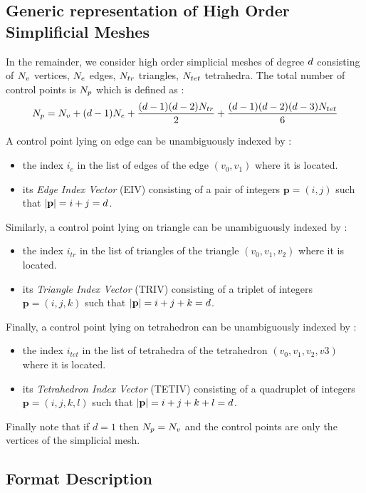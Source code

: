 \documentclass[a4paper,11pt]{article}
\begin{document}
\subsection{Generic representation of High Order Simplificial Meshes}

In the remainder, we consider high order simplicial meshes of degree ${d}$ consisting of ${N_v}$ vertices, ${ N_e}$ edges, ${N_{tr}}$ triangles, ${N_{tet}}$ tetrahedra. The total number of control points is ${N_{p}}$ which is defined as :
\begin{equation}
{N_{p}}={N_v} + ({d}-1){ N_e}+\frac{({d}-1)({d}-2){N_{tr}}}{2} +\frac{({d}-1)({d}-2)({d}-3){N_{tet}}}{6}
\label{eq;np}
\end{equation}


A control point lying on edge can be unambiguously indexed by :
\begin{itemize}
	\item the index $i_e$ in the list of edges of the edge $(v_0,v_1)$ where it is located.
	\item its {\em Edge Index Vector} (EIV) consisting of a pair of integers ${\mathbf p}=(i,j)$ such that $|{\mathbf p}|=i+j={d}$.
\end{itemize}

Similarly, a control point lying on triangle can be unambiguously indexed by :
\begin{itemize}
	\item the index $i_{tr}$ in the list of triangles of the triangle $(v_0,v_1,v_2)$ where it is located.
	\item its {\em Triangle Index Vector} (TRIV) consisting of a triplet of integers ${\mathbf p}=(i,j,k)$ such that $|{\mathbf p}|=i+j+k={d}$.
\end{itemize}
Finally, a control point lying on tetrahedron can be unambiguously indexed by :
\begin{itemize}
	\item the index $i_{tet}$ in the list of tetrahedra of the tetrahedron $(v_0,v_1,v_2,v3)$ where it is located.
	\item its {\em Tetrahedron Index Vector} (TETIV) consisting of a quadruplet of integers ${\mathbf p}=(i,j,k,l)$ such that $|{\mathbf p}|=i+j+k+l={d}$.
\end{itemize}
Finally note that if $d=1$ then ${N_{p}}={N_v}$ and the control points are only the vertices of the simplicial mesh.

\subsection{Format Description}
\end{document}
